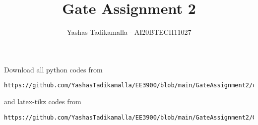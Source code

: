 \documentclass[journal,12pt,twocolumn]{IEEEtran}
\DeclareMathOperator*{\Res}{Res}
\begin{document}
\newcommand{\BEQA}{\begin{eqnarray}}
\newcommand{\EEQA}{\end{eqnarray}}
\newcommand{\define}{\stackrel{\triangle}{=}}

\raggedbottom
\setlength{\parindent}{0pt}
\providecommand{\mbf}{\mathbf}
\providecommand{\pr}[1]{\ensuremath{\Pr\left(#1\right)}}
\providecommand{\qfunc}[1]{\ensuremath{Q\left(#1\right)}}
\providecommand{\sbrak}[1]{\ensuremath{{}\left[#1\right]}}
\providecommand{\lsbrak}[1]{\ensuremath{{}\left[#1\right.}}
\providecommand{\rsbrak}[1]{\ensuremath{{}\left.#1\right]}}
\providecommand{\brak}[1]{\ensuremath{\left(#1\right)}}
\providecommand{\lbrak}[1]{\ensuremath{\left(#1\right.}}
\providecommand{\rbrak}[1]{\ensuremath{\left.#1\right)}}
\providecommand{\cbrak}[1]{\ensuremath{\left\{#1\right\}}}
\providecommand{\lcbrak}[1]{\ensuremath{\left\{#1\right.}}
\providecommand{\rcbrak}[1]{\ensuremath{\left.#1\right\}}}
\theoremstyle{remark}
\newtheorem{rem}{Remark}
\newtheorem*{remark}{Remark}
\newcommand{\sgn}{\mathop{\mathrm{sgn}}}
\providecommand{\abs}[1]{\vert#1\vert}
\providecommand{\res}[1]{\Res\displaylimits_{#1}} 
\providecommand{\norm}[1]{\lVert#1\rVert}
\providecommand{\mtx}[1]{\mathbf{#1}}
\providecommand{\mean}[1]{E[ #1 ]}
\providecommand{\fourier}{\overset{\mathcal{F}}{ \rightleftharpoons}}
\providecommand{\system}{\overset{\mathcal{H}}{ \longleftrightarrow}}
\newcommand{\solution}{\noindent \textbf{Solution: }}
\newcommand{\cosec}{\,\text{cosec}\,}
\providecommand{\dec}[2]{\ensuremath{\overset{#1}{\underset{#2}{\gtrless}}}}
\newcommand{\myvec}[1]{\ensuremath{\begin{pmatrix}#1\end{pmatrix}}}
\newcommand{\mydet}[1]{\ensuremath{\begin{vmatrix}#1\end{vmatrix}}}
\makeatletter
{}
\makeatother
\let\StandardTheFigure\thefigure
\let\vec\mathbf
\renewcommand{\thefigure}{\theproblem}
\def\putbox#1#2#3{\makebox[0in][l]{\makebox[#1][l]{}\raisebox{\baselineskip}[0in][0in]{\raisebox{#2}[0in][0in]{#3}}}}
     \def\rightbox#1{\makebox[0in][r]{#1}}
     \def\centbox#1{\makebox[0in]{#1}}
     \def\topbox#1{\raisebox{-\baselineskip}[0in][0in]{#1}}
     \def\midbox#1{\raisebox{-0.5\baselineskip}[0in][0in]{#1}}
\vspace{3cm}
\title{Gate Assignment 2}
\author{Yashas Tadikamalla - AI20BTECH11027}
\maketitle
\newpage
\bigskip
\renewcommand{\thefigure}{\theenumi}
\renewcommand{\thetable}{\theenumi}
Download all python codes from 
\begin{lstlisting}
https://github.com/YashasTadikamalla/EE3900/blob/main/GateAssignment2/codes
\end{lstlisting}
%
and latex-tikz codes from 
%
\begin{lstlisting}
https://github.com/YashasTadikamalla/EE3900/blob/main/GateAssignment2/GateAssignment2.tex
\end{lstlisting}
\end{document}

